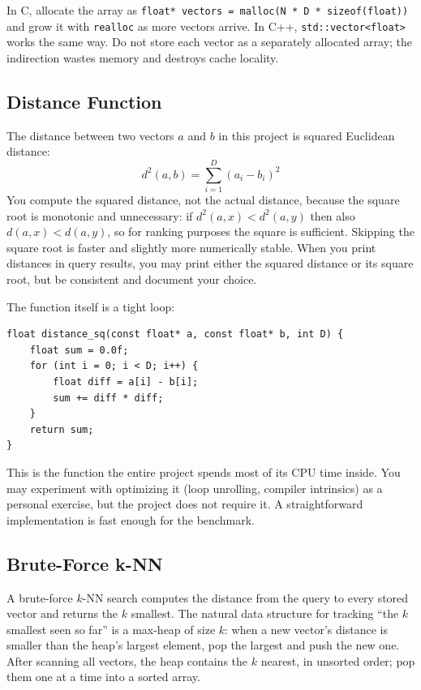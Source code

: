 \documentclass[11pt,a4paper]{article}
\begin{document}
In C, allocate the array as \texttt{float* vectors = malloc(N * D * sizeof(float))} and grow it with \texttt{realloc} as more vectors arrive. In C++, \texttt{std::vector<float>} works the same way. Do not store each vector as a separately allocated array; the indirection wastes memory and destroys cache locality.

\subsection{Distance Function}
The distance between two vectors $a$ and $b$ in this project is squared Euclidean distance:
\[
d^2(a, b) = \sum_{i=1}^{D} (a_i - b_i)^2
\]
You compute the squared distance, not the actual distance, because the square root is monotonic and unnecessary: if $d^2(a, x) < d^2(a, y)$ then also $d(a, x) < d(a, y)$, so for ranking purposes the square is sufficient. Skipping the square root is faster and slightly more numerically stable. When you print distances in query results, you may print either the squared distance or its square root, but be consistent and document your choice.

The function itself is a tight loop:
\begin{codebox}
\begin{lstlisting}
float distance_sq(const float* a, const float* b, int D) {
    float sum = 0.0f;
    for (int i = 0; i < D; i++) {
        float diff = a[i] - b[i];
        sum += diff * diff;
    }
    return sum;
}
\end{lstlisting}
\end{codebox}

This is the function the entire project spends most of its CPU time inside. You may experiment with optimizing it (loop unrolling, compiler intrinsics) as a personal exercise, but the project does not require it. A straightforward implementation is fast enough for the benchmark.

\subsection{Brute-Force k-NN}
A brute-force $k$-NN search computes the distance from the query to every stored vector and returns the $k$ smallest. The natural data structure for tracking ``the $k$ smallest seen so far'' is a max-heap of size $k$: when a new vector's distance is smaller than the heap's largest element, pop the largest and push the new one. After scanning all vectors, the heap contains the $k$ nearest, in unsorted order; pop them one at a time into a sorted array.
\end{document}
